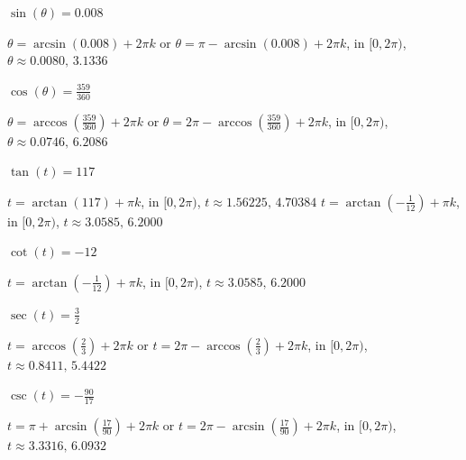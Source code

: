 \documentclass{ximera}
\begin{document}
\begin{question}
\begin{problem}
$\sin(\theta) = 0.008$

\begin{solution}
$\theta = \arcsin(0.008) + 2\pi k$ or $\theta = \pi - \arcsin(0.008) + 2\pi k$, in  $[0, 2\pi)$, $\theta \approx 0.0080, \, 3.1336$
\end{solution}
\end{problem}

\begin{problem}
$\cos(\theta) = \frac{359}{360}$

\begin{solution}
$\theta = \arccos\left(\frac{359}{360}\right) + 2\pi k$ or $\theta = 2\pi - \arccos\left(\frac{359}{360}\right) + 2\pi k$, in  $[0, 2\pi)$, $\theta \approx 0.0746, \, 6.2086$
\end{solution}
\end{problem}

\begin{problem}
$\tan(t) = 117$

\begin{solution}
$t = \arctan(117) + \pi k$, in  $[0, 2\pi)$, $t \approx 1.56225, \, 4.70384$
$t = \arctan\left(-\frac{1}{12}\right) + \pi k$, in  $[0, 2\pi)$,  $t \approx 3.0585, \, 6.2000$
\end{solution}
\end{problem}

\begin{problem}
$\cot(t) = -12$

\begin{solution}
$t = \arctan\left(-\frac{1}{12}\right) + \pi k$, in  $[0, 2\pi)$,  $t \approx 3.0585, \, 6.2000$
\end{solution}
\end{problem}

\begin{problem}
$\sec(t) = \frac{3}{2}$

\begin{solution}
$t = \arccos\left(\frac{2}{3}\right) + 2\pi k$ or $t = 2\pi - \arccos\left(\frac{2}{3}\right) + 2\pi k$, in  $[0, 2\pi)$, $t \approx 0.8411, \, 5.4422$
\end{solution}
\end{problem}

\begin{problem}
$\csc(t) = -\frac{90}{17}$

\begin{solution}
$t = \pi + \arcsin\left(\frac{17}{90}\right) + 2\pi k$ or $t = 2\pi - \arcsin\left(\frac{17}{90}\right) + 2\pi k$, in  $[0, 2\pi)$, $t \approx 3.3316, \, 6.0932$
\end{solution}
\end{problem}


\end{question}
\end{document}
